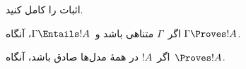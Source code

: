 \documentclass[../../../include/open-logic-section]{subfiles}
\begin{document}
\begin{prob}
اثبات  را کامل کنید.
\end{prob}

\begin{cor}
اگر~$\Gamma$ متناهی باشد و~$\Gamma \Entails !A$، آنگاه
$\Gamma \Proves !A$.
\end{cor}

\begin{cor}
اگر~$!A$ در همهٔ مدل‌ها صادق باشد، آنگاه~$\Proves !A$.
\end{cor}
\end{document}
